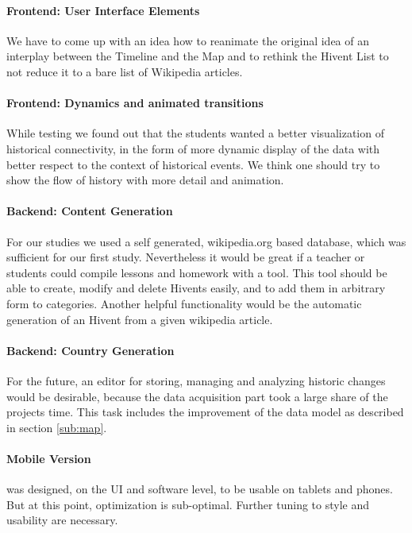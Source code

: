 \paragraph{Frontend: User Interface Elements} %
\label{par:concept}
We have to come up with an idea how to reanimate the original idea of an interplay between the Timeline and the Map and to rethink the Hivent List to not reduce it to a bare list of Wikipedia articles.

\paragraph{Frontend: Dynamics and animated transitions} %
\label{sub:dynamics_and_animated_transitions}
While testing \HG we found out that the students wanted a better visualization of historical connectivity, in the form of  more dynamic display of the data with better respect to the context of historical events. We think one should try to show the flow of history with more detail and animation.


\paragraph{Backend: Content Generation} %
\label{sub:content_generation_backend}

For our studies we used a self generated, wikipedia.org based database, which was sufficient for our first study. Nevertheless it would be great if a teacher or students could compile lessons and homework with a tool. This tool should be able to create, modify and delete Hivents easily, and to add them in arbitrary form to categories. Another helpful functionality would be the automatic generation of an Hivent from a given wikipedia article.

\paragraph{Backend: Country Generation} %
\label{sub:country_generation_backend}
For the future, an editor for storing, managing and analyzing historic changes would be desirable, because the data acquisition part took a large share of the projects time. This task includes the improvement of the data model as described in section \ref{sub:map}.

\paragraph{Mobile Version} %
\label{sub:mobile_version}
\HG was designed, on the UI and software level, to be usable on tablets and phones. But at this point, optimization is sub-optimal.
Further tuning to style and usability are necessary.


